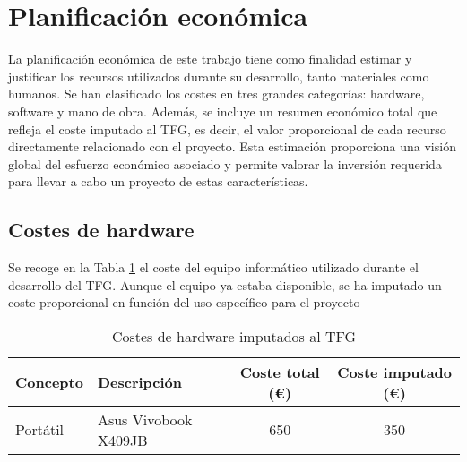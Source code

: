 \section{Planificación económica}
La planificación económica de este trabajo tiene como finalidad estimar y justificar los recursos utilizados durante su desarrollo, tanto materiales como humanos. Se han clasificado los costes en tres grandes categorías: hardware, software y mano de obra. Además, se incluye un resumen económico total que refleja el coste imputado al TFG, es decir, el valor proporcional de cada recurso directamente relacionado con el proyecto. Esta estimación proporciona una visión global del esfuerzo económico asociado y permite valorar la inversión requerida para llevar a cabo un proyecto de estas características.

\subsection{Costes de hardware}

Se recoge en la Tabla \ref{hardware} el coste del equipo informático utilizado durante el desarrollo del TFG. Aunque el equipo ya estaba disponible, se ha imputado un coste proporcional en función del uso específico para el proyecto
\begin{table}[H]

\centering
\small
\begin{tabular}{|l|l|c|c|}
\hline
\textbf{Concepto} & \textbf{Descripción} & \textbf{Coste total (€)} & \textbf{Coste imputado (€)} \\
\hline
Portátil & Asus Vivobook X409JB & 650 & 350 \\
\hline
\end{tabular}
\caption{Costes de hardware imputados al TFG}
\label{hardware}
\end{table}

